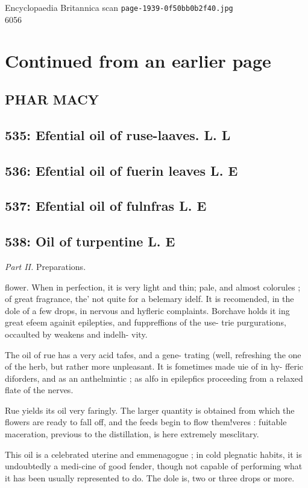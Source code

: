 \documentclass{article}
\begin{document}
\begin{center}
{\Large Encyclopaedia Britannica scan \texttt{page-1939-0f50bb0b2f40.jpg}}\\[0.5em]
6056
\end{center}
\section*{Continued from an earlier page}
\subsection*{PHAR MACY}
\subsection*{535: Efential oil of ruse-laaves. L. L}
\subsection*{536: Efential oil of fuerin leaves L. E}
\subsection*{537: Efential oil of fulnfras L. E}
\subsection*{538: Oil of turpentine L. E}
\textit{Part II.}
Preparations.

flower. When in perfection, it is very light and thin; pale, and almost colorules ; of great fragrance, the’ not quite for a belemary idelf. It is recomended, in the dole of a few drops, in nervous and hyfleric complaints. Borchave holds it ing great efeem againit epilepties, and fuppreffions of the use- trie purgurations, occaulted by weakens and indelh- vity.

The oil of rue has a very acid tafes, and a gene- trating (well, refreshing the one of the herb, but rather more unpleasant. It is fometimes made uie of in hy- fferic diforders, and as an anthelmintic ; as alfo in epilepfics proceeding from a relaxed flate of the nerves.

Rue yields its oil very faringly. The larger quantity is obtained from which the flowers are ready to fall off, and the feeds begin to flow them!veres : fuitable maceration, previous to the distillation, is here extremely mesclitary.

This oil is a celebrated uterine and emmenagogue ; in cold plegnatic habits, it is undoubtedly a medi-cine of good fender, though not capable of performing what it has been usually represented to do. The dole is, two or three drops or more.
\end{document}
